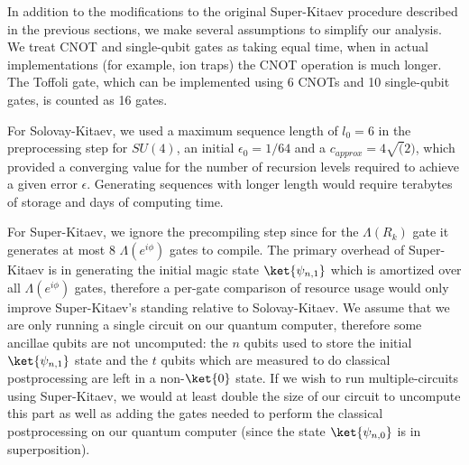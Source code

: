 In addition to the modifications to the original Super-Kitaev procedure
described in the previous sections, we make several assumptions to
simplify our analysis. We treat CNOT and single-qubit gates as taking
equal time, when in actual implementations (for example, ion traps) the CNOT
operation is much longer. The Toffoli gate, which can be implemented using
6 CNOTs and 10 single-qubit gates, is counted as 16 gates.

For Solovay-Kitaev, we used a maximum sequence length of $l_0=6$ in the
preprocessing step for $SU(4)$, an initial $\epsilon_0 = 1/64$ and a
$c_{approx} = 4\sqrt(2)$, which provided a converging value for the number of
recursion levels required to achieve a given error $\epsilon$. Generating
sequences with longer length would require terabytes of storage and days
of computing time.

For Super-Kitaev, we ignore the precompiling step since for the $\Lambda(R_k)$
gate it generates at most 8 $\Lambda(e^{i\phi})$ gates to compile. The
primary overhead of Super-Kitaev is in generating the initial magic state
$\ket{\psi_{n,1}}$ which is amortized over all $\Lambda(e^{i\phi})$
gates, therefore a per-gate comparison of resource usage would only
improve Super-Kitaev's standing relative to Solovay-Kitaev. We assume that we
are only running a single circuit on our quantum computer, therefore some
ancillae qubits are not uncomputed: the $n$ qubits used to store the
initial $\ket{\psi_{n,1}}$ state and the $t$ qubits which are measured to
do classical postprocessing are left in a non-$\ket{0}$ state. If we wish to
run multiple-circuits using Super-Kitaev, we would at least double the
size of our circuit to uncompute this part as well as adding the gates
needed to perform
the classical postprocessing on our quantum computer (since the state
$\ket{\psi_{n,0}}$ is in superposition).